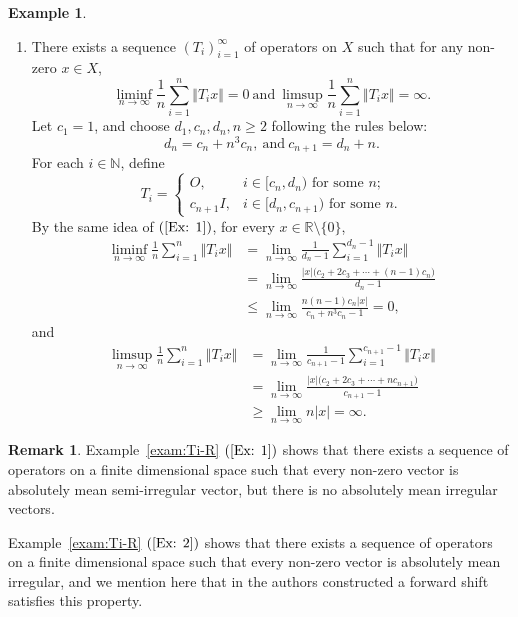 \documentclass[12pt,a4paper]{amsart}
\theoremstyle{definition}
\newtheorem{exam}[defn]{Example}
\newtheorem{rem}[defn]{Remark}
\theoremstyle{plain}
\begin{document}
\begin{exam}
\begin{enumerate}
        \item \label{Ex: 2}
         There exists a sequence $(T_i)_{i=1}^{\infty}$ of operators on $X$ such that for any non-zero $x\in X$,
              \[
                  \liminf_{n\to\infty}
                  \frac{1}{n}\sum_{i=1}^{n}\Vert T_i x\Vert=0  \ \text {and} \
                  \limsup_{n\to\infty}
                  \frac{1}{n}\sum_{i=1}^{n}\Vert T_i x\Vert=\infty.
              \]
              Let $c_1=1$, and choose $d_1, c_n, d_n, n\ge 2$ following the rules below:
              \[
                  d_n=c_n+n^3c_n, \ \text{and} \ c_{n+1}=d_n+n.
              \]
              For each $i\in\mathbb{N}$, define
              \[
                  T_i=\begin{cases}
                      O,         & i\in [c_n,d_n)\text{ for some } n;     \\
                      c_{n+1} I, & i\in [d_n,c_{n+1})\text{ for some } n.
                  \end{cases}
              \]
              By the same idea of $(\ref{Ex: 1})$, for every $x\in\mathbb{R}\setminus\{0\}$,
              \begin{align*}
                  \liminf_{n\to\infty}
                  \frac{1}{n}\sum_{i=1}^{n}\Vert T_i x\Vert
                   & = \lim_{n\to\infty} \frac{1}{d_n-1}
                  \sum_{i=1}^{d_n-1 }\Vert T_i x\Vert \\
                   & =\lim_{n\to\infty} \frac{|x| \biggr( c_2+2c_3+\cdots+(n-1)c_n   \biggr)}{d_n-1} \\
                   & \le \lim_{n\to\infty}   \frac{ n(n-1)c_n |x|}{c_n+n^3c_n-1} =0,
              \end{align*}
              and
              \begin{align*}
                  \limsup_{n\to\infty}
                  \frac{1}{n}\sum_{i=1}^{n}\Vert T_i x\Vert & = \lim_{n\to\infty} \frac{1}{c_{n+1}-1}\sum_{i=1}^{c_{n+1}-1} \Vert T_i x\Vert \\
                  & = \lim_{n\to\infty}  \frac{|x| \biggr( c_2+2c_3+\cdots+nc_{n+1}   \biggr)}{c_{n+1}-1} \\
                & \ge  \lim_{n\to\infty} n|x|=\infty.
              \end{align*}
    \end{enumerate}
\end{exam}

\begin{rem}
    Example~\ref{exam:Ti-R} $(\ref{Ex: 1})$ shows that there exists a sequence of operators on a finite dimensional space such that every non-zero vector is absolutely mean semi-irregular vector, but there is no absolutely mean irregular vectors.

    Example~\ref{exam:Ti-R} $(\ref{Ex: 2})$ shows that there exists a sequence of operators on a finite dimensional space such that every non-zero vector is absolutely mean irregular, and we mention here that in \cite{BBP2020} the authors constructed a forward shift satisfies this property.
\end{rem}
\end{document}
